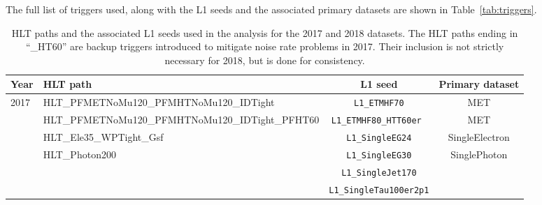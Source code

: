 The full list of triggers used, along with the L1 seeds and the associated primary datasets are shown in Table~\ref{tab:triggers}.
\begin{table}[h]
    \centering
    \def\arraystretch{1.5}

    \small
    \caption{HLT paths and the associated L1 seeds used in the analysis for the 2017 and 2018 datasets. 
    The HLT paths ending in ``\_HT60'' are backup triggers introduced to mitigate noise rate problems in 2017. 
    Their inclusion is not strictly necessary for 2018, but is done for consistency.}

    \footnotesize
    \begin{tabular}{l l c c}
        \hline\hline
        Year                   & HLT path                                                  & L1 seed                         & Primary dataset               \\\hline\hline
        \multirow{5}{*}{2017}  & HLT\_PFMETNoMu120\_PFMHTNoMu120\_IDTight                  & \texttt{L1\_ETMHF70}            & MET                           \\
                               & HLT\_PFMETNoMu120\_PFMHTNoMu120\_IDTight\_PFHT60          & \texttt{L1\_ETMHF80\_HTT60er }  & MET                           \\\cline{2-4}
                               & HLT\_Ele35\_WPTight\_Gsf                                  & \texttt{L1\_SingleEG24}         & SingleElectron                \\\cline{2-4}
                               & \multirow{3}{*}{HLT\_Photon200}                           & \texttt{L1\_SingleEG30}         & \multirow{3}{*}{SinglePhoton} \\
                               &                                                           & \texttt{L1\_SingleJet170}       &                               \\
                               &                                                           & \texttt{L1\_SingleTau100er2p1}  &                               \\\hline\hline


\end{tabular}
\end{table}
